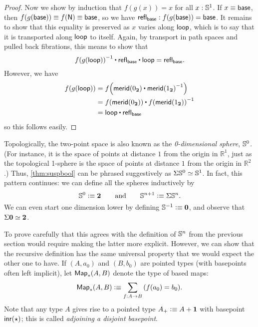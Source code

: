 \begin{proof}
  Now we show by induction that $f(g(x))=x$ for all $x:\mathbb{S}^1$.
  If $x\equiv \mathsf{base}$, then $f(g(\mathsf{base}))\equiv f(\mathsf{N})\equiv\mathsf{base}$, so we have $\mathsf{refl}_{\mathsf{base}} : f(g(\mathsf{base}))=\mathsf{base}$.
  It remains to show that this equality is preserved as $x$ varies along $\mathsf{loop}$, which is to say that it is transported along $\mathsf{loop}$ to itself.
  Again, by transport in path spaces and pulled back fibrations, this means to show that
  \[ \opp{\ap f {\ap g {\lloop}}} \ct \refl{\base} \ct \lloop = \refl{\base}.\]
  However, we have
  \begin{align*}
    \ap f {\ap g {\lloop}} &= \ap f {\merid(\bfalse) \ct \opp{\merid(\btrue)}}\\
    &= \ap f {\merid(\bfalse)} \ct \opp{\ap f {\merid(\btrue)}}\\
    &= \lloop \ct \refl{\base}
  \end{align*}
  so this follows easily.
\end{proof}

Topologically, the two-point space \bool is also known as the \emph{0-dimensional sphere}, $\mathbb{S}^0$.
(For instance, it is the space of points at distance $1$ from the origin in $\mathbb{R}^1$, just as the topological 1-sphere is the space of points at distance $1$ from the origin in $\mathbb{R}^2$.)
Thus, \autoref{thm:suspbool} can be phrased suggestively as $\Sigma\mathbb{S}^0 \simeq \mathbb{S}^1$.
%
%
In fact, this pattern continues: we can define all the spheres inductively by
\begin{equation}\label{eq:Snsusp}
  \Sn^0 \defeq \bool
  \qquad\text{and}\qquad
  \Sn^{n+1} \defeq \susp \Sn^n.
\end{equation}
We can even start one dimension lower by defining $\mathbb{S}^{-1}\vcentcolon\equiv \mathbf{0}$, and observe that $\Sigma\mathbf{0} \simeq \mathbf{2}$.

To prove carefully that this agrees with the definition of $\mathbb{S}^n$ from the previous section would require making the latter more explicit.
However, we can show that the recursive definition has the same universal property that we would expect the other one to have.
If $(A,a_0)$ and $(B,b_0)$ are pointed types (with basepoints often left implicit), let $\mathsf{Map}_*(A,B)$ denote the type of based maps:
\[ \Map_*(A,B) \defeq \sm{f:A\to B} (f(a_0)=b_0). \]
Note that any type $A$ gives rise to a pointed type $A_+ \vcentcolon\equiv A+\mathbf{1}$ with basepoint ${\mathsf{inr}}(\star)$; this is called \emph{adjoining a disjoint basepoint}.
%
%
%


